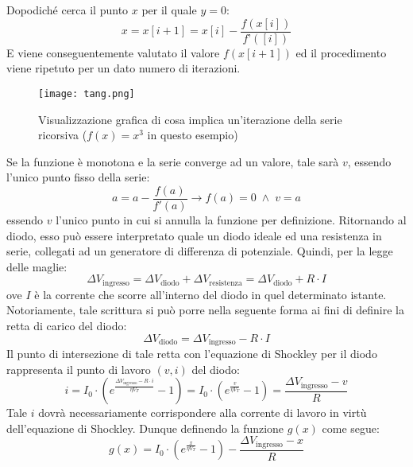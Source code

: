 \documentclass{article}[a4paper, oneside, 11pt]
\begin{document}
 Dopodiché cerca il punto $x$ per il quale $y = 0$:
\begin{equation}
x = x[i+1] = x[i] - \frac{f(x[i])}{f’([i])}
\end{equation}
E viene conseguentemente valutato il valore $f(x[i+1])$ ed il procedimento viene 
ripetuto per un dato numero di iterazioni. 
\begin{figure}[!htbp]
	\centering 
 		\texttt{[image: tang.png]}
	\caption{Visualizzazione grafica di cosa implica un’iterazione della 
	serie ricorsiva ($f(x) = x^3$ in questo esempio)\label{fig: tang}}
\end{figure}
Se la funzione è monotona e la serie converge ad un valore, tale sarà $v$, 
essendo l’unico punto fisso della serie:
\begin{equation}
 a = a -  \frac{f(a)}{f'(a)} \to f(a) = 0 \; \land \; v = a
\end{equation}
essendo $v$ l’unico punto in cui si annulla la funzione per definizione.
Ritornando al diodo, esso può essere interpretato quale un diodo ideale ed una 
resistenza in serie, collegati ad un generatore di differenza di potenziale. 
Quindi, per la legge delle maglie:
\begin{equation}
\Delta V_{\text{ingresso}} = \Delta V_{\text{diodo}} + \Delta 
V_{\text{resistenza}} = \Delta V_{\text{diodo}} + R \cdot I
\end{equation}
ove $I$ è la corrente che scorre all’interno del diodo in quel determinato 
istante. Notoriamente, tale scrittura si può porre nella seguente forma ai 
fini di definire la retta di carico del diodo:
\begin{equation}
\Delta V_{\text{diodo}} = \Delta V_{\text{ingresso}} - R \cdot I
\end{equation}
Il punto di intersezione di tale retta con l’equazione di Shockley per il 
diodo rappresenta il punto di lavoro $(v, i)$ del diodo:
\begin{equation}
i = I_0 \cdot ( e^{\frac {\Delta V_{\text{ingresso}} - R \cdot i}{\eta V_T} } - 
1) = I_0 \cdot (e^{\frac{v} {\eta V_T}} -1) =  \frac{\Delta V_{\text{ingresso}} 
- v}{R}
\end{equation}
Tale $i$ dovrà necessariamente corrispondere alla corrente di lavoro in virtù 
dell’equazione di Shockley. Dunque definendo la funzione $g(x)$ come segue:
\begin{equation}\label{eq: invsck}
g(x) = I_0 \cdot ( e^{\frac{x}{\eta V_T}} - 1)  - \frac {\Delta 
V_{\text{ingresso}} - x}{R}
\end{equation}
\end{document}
